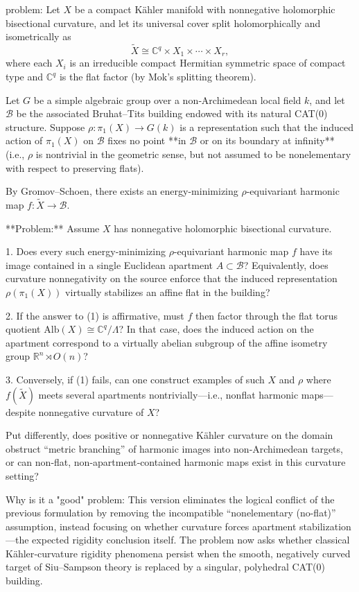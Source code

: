 problem:  
Let \(X\) be a compact Kähler manifold with nonnegative holomorphic bisectional curvature, and let its universal cover split holomorphically and isometrically as  
\[
\widetilde{X} \cong \mathbb{C}^q \times X_1 \times \cdots \times X_r,
\]
where each \(X_i\) is an irreducible compact Hermitian symmetric space of compact type and \(\mathbb{C}^q\) is the flat factor (by Mok’s splitting theorem).  

Let \(G\) be a simple algebraic group over a non‑Archimedean local field \(k\), and let \(\mathscr{B}\) be the associated Bruhat–Tits building endowed with its natural CAT(0) structure.  
Suppose \(\rho : \pi_1(X) \rightarrow G(k)\) is a representation such that the induced action of \(\pi_1(X)\) on \(\mathscr{B}\) fixes no point **in \(\mathscr{B}\) or on its boundary at infinity** (i.e., \(\rho\) is nontrivial in the geometric sense, but not assumed to be nonelementary with respect to preserving flats).  

By Gromov–Schoen, there exists an energy-minimizing \(\rho\)-equivariant harmonic map \( f : \widetilde{X} \rightarrow \mathscr{B} \).

**Problem:**  
Assume \(X\) has nonnegative holomorphic bisectional curvature.  

1. Does every such energy-minimizing \(\rho\)-equivariant harmonic map \(f\) have its image contained in a single Euclidean apartment \(A\subset\mathscr{B}\)?  
   Equivalently, does curvature nonnegativity on the source enforce that the induced representation \(\rho(\pi_1(X))\) virtually stabilizes an affine flat in the building?  

2. If the answer to (1) is affirmative, must \(f\) then factor through the flat torus quotient \(\mathrm{Alb}(X) \cong \mathbb{C}^q/\Lambda\)?  
   In that case, does the induced action on the apartment correspond to a virtually abelian subgroup of the affine isometry group \(\mathbb{R}^n \rtimes O(n)\)?  

3. Conversely, if (1) fails, can one construct examples of such \(X\) and \(\rho\) where \(f(\widetilde{X})\) meets several apartments nontrivially—i.e., nonflat harmonic maps—despite nonnegative curvature of \(X\)?  

Put differently, does positive or nonnegative Kähler curvature on the domain obstruct “metric branching” of harmonic images into non‑Archimedean targets, or can non-flat, non-apartment‑contained harmonic maps exist in this curvature setting?

Why is it a "good" problem:  
This version eliminates the logical conflict of the previous formulation by removing the incompatible “nonelementary (no-flat)” assumption, instead focusing on whether curvature forces apartment stabilization—the expected rigidity conclusion itself. The problem now asks whether classical Kähler‑curvature rigidity phenomena persist when the smooth, negatively curved target of Siu–Sampson theory is replaced by a singular, polyhedral CAT(0) building.  

